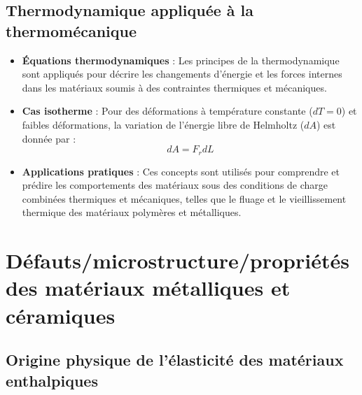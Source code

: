 \documentclass{article}
\begin{document}
    \subsection{Thermodynamique appliquée à la thermomécanique}
    
    \begin{itemize}
        \item \textbf{Équations thermodynamiques} : Les principes de la thermodynamique sont appliqués pour décrire les changements d'énergie et les forces internes dans les matériaux soumis à des contraintes thermiques et mécaniques.
        \item \textbf{Cas isotherme} : Pour des déformations à température constante ($dT = 0$) et faibles déformations, la variation de l'énergie libre de Helmholtz ($dA$) est donnée par :
        \[
        dA = F_r dL
        \]
        \item \textbf{Applications pratiques} : Ces concepts sont utilisés pour comprendre et prédire les comportements des matériaux sous des conditions de charge combinées thermiques et mécaniques, telles que le fluage et le vieillissement thermique des matériaux polymères et métalliques.
    \end{itemize}

\section{Défauts/microstructure/propriétés des matériaux métalliques et céramiques}
    \subsection{Origine physique de l’élasticité des matériaux enthalpiques}
    
\end{document}
